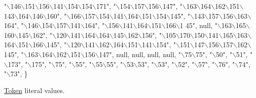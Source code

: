 \begin{DoxyCode}
\textcolor{stringliteral}{"\(\backslash\)146\(\backslash\)151\(\backslash\)156\(\backslash\)141\(\backslash\)154\(\backslash\)154\(\backslash\)171"}, \textcolor{stringliteral}{"\(\backslash\)154\(\backslash\)157\(\backslash\)156\(\backslash\)147"}, \textcolor{stringliteral}{"\(\backslash\)163\(\backslash\)164\(\backslash\)162\(\backslash\)151\(\backslash\)143\(\backslash\)164\(\backslash\)146\(\backslash\)160"}, 
\textcolor{stringliteral}{"\(\backslash\)166\(\backslash\)157\(\backslash\)154\(\backslash\)141\(\backslash\)164\(\backslash\)151\(\backslash\)154\(\backslash\)145"}, \textcolor{stringliteral}{"\(\backslash\)143\(\backslash\)157\(\backslash\)156\(\backslash\)163\(\backslash\)164"}, \textcolor{stringliteral}{"\(\backslash\)146\(\backslash\)154\(\backslash\)157\(\backslash\)141\(\backslash\)164"}, \textcolor{stringliteral}{"\(\backslash\)156\(\backslash\)141\(\backslash\)164\(\backslash\)151\(\backslash\)166\(\backslash\)1
      45"}, 
null, \textcolor{stringliteral}{"\(\backslash\)163\(\backslash\)165\(\backslash\)160\(\backslash\)145\(\backslash\)162"}, \textcolor{stringliteral}{"\(\backslash\)120\(\backslash\)141\(\backslash\)164\(\backslash\)164\(\backslash\)145\(\backslash\)162\(\backslash\)156"}, 
\textcolor{stringliteral}{"\(\backslash\)105\(\backslash\)170\(\backslash\)150\(\backslash\)141\(\backslash\)165\(\backslash\)163\(\backslash\)164\(\backslash\)151\(\backslash\)166\(\backslash\)145"}, \textcolor{stringliteral}{"\(\backslash\)120\(\backslash\)141\(\backslash\)162\(\backslash\)164\(\backslash\)151\(\backslash\)141\(\backslash\)154"}, \textcolor{stringliteral}{"\(\backslash\)151\(\backslash\)147\(\backslash\)156\(\backslash\)157\(\backslash\)162\(\backslash\)145"}, 
\textcolor{stringliteral}{"\(\backslash\)163\(\backslash\)164\(\backslash\)162\(\backslash\)151\(\backslash\)156\(\backslash\)147"}, null, null, null, null, \textcolor{stringliteral}{"\(\backslash\)75\(\backslash\)75"}, \textcolor{stringliteral}{"\(\backslash\)50"}, \textcolor{stringliteral}{"\(\backslash\)51"}, \textcolor{stringliteral}{"\(\backslash\)173"}, \textcolor{stringliteral}{"\(\backslash\)175"}, \textcolor{stringliteral}{"\(\backslash\)75"}, \textcolor{stringliteral}{"\(\backslash\)55"}, 
\textcolor{stringliteral}{"\(\backslash\)55\(\backslash\)55"}, \textcolor{stringliteral}{"\(\backslash\)53\(\backslash\)53"}, \textcolor{stringliteral}{"\(\backslash\)53"}, \textcolor{stringliteral}{"\(\backslash\)52"}, \textcolor{stringliteral}{"\(\backslash\)57"}, \textcolor{stringliteral}{"\(\backslash\)76"}, \textcolor{stringliteral}{"\(\backslash\)74"}, \textcolor{stringliteral}{"\(\backslash\)73"}, \}
\end{DoxyCode}
\hyperlink{classpack_1_1_token}{Token} literal values. 
